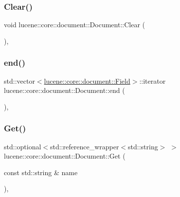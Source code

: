 \subsubsection{\texorpdfstring{Clear()}{Clear()}}
{\footnotesize\ttfamily void lucene\+::core\+::document\+::\+Document\+::\+Clear (\begin{DoxyParamCaption}{ }\end{DoxyParamCaption})\hspace{0.3cm}{\ttfamily [inline]}, {\ttfamily [noexcept]}}

\mbox{\label{classlucene_1_1core_1_1document_1_1Document_ad0a1cb1cadecb670e770ee744a48a619}} 
\subsubsection{\texorpdfstring{end()}{end()}}
{\footnotesize\ttfamily std\+::vector$<$\mbox{\hyperlink{classlucene_1_1core_1_1document_1_1Field}{lucene\+::core\+::document\+::\+Field}}$>$\+::iterator lucene\+::core\+::document\+::\+Document\+::end (\begin{DoxyParamCaption}{ }\end{DoxyParamCaption})\hspace{0.3cm}{\ttfamily [inline]}, {\ttfamily [noexcept]}}

\mbox{\label{classlucene_1_1core_1_1document_1_1Document_aaa33b6b731feba963643568e9df77dfc}} 
\subsubsection{\texorpdfstring{Get()}{Get()}}
{\footnotesize\ttfamily std\+::optional$<$std\+::reference\+\_\+wrapper$<$std\+::string$>$ $>$ lucene\+::core\+::document\+::\+Document\+::\+Get (\begin{DoxyParamCaption}\item[{const std\+::string \&}]{name }\end{DoxyParamCaption})\hspace{0.3cm}{\ttfamily [inline]}, {\ttfamily [noexcept]}}

